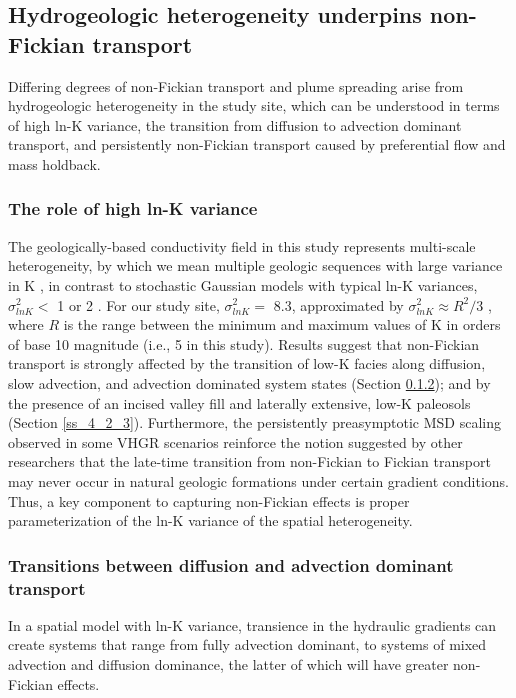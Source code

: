 %
%
\subsection{Hydrogeologic heterogeneity underpins non-Fickian transport}
\label{ss_4_2}

Differing degrees of non-Fickian transport and plume spreading arise from hydrogeologic heterogeneity in the study site, which can be understood in terms of high ln-K variance, the transition from diffusion to advection dominant transport, and persistently non-Fickian transport caused by preferential flow and mass holdback.

%
\subsubsection{The role of high ln-K variance}
\label{ss_4_2_1}

The geologically-based conductivity field in this study represents multi-scale heterogeneity, by which we mean multiple geologic sequences with large variance in K \citep{weissmann1999multi}, in contrast to stochastic Gaussian models with typical ln-K variances, $\sigma^2_{lnK} < $ 1 or 2 \citep{gelhar1993stochastic, rubin2003applied}. For our study site, $\sigma^2_{lnK} = $ 8.3, approximated by $\sigma^2_{lnK} \approx R^2/3$ \citep{fogg2016debates}, where $R$ is the range between the minimum and maximum values of K in orders of base 10 magnitude (i.e., 5 in this study).  Results suggest that non-Fickian transport is strongly affected by the transition of low-K facies along diffusion, slow advection, and advection dominated system states (Section \ref{ss_4_2_2}); and by the presence of an incised valley fill and laterally extensive, low-K paleosols (Section \ref{ss_4_2_3}). Furthermore, the persistently preasymptotic MSD scaling observed in some VHGR scenarios reinforce the notion suggested by other researchers \citep[e.g.][]{matheron1980transport, neuman1990universal, zhang2007persistence} that the late-time transition from non-Fickian to Fickian transport may never occur in natural geologic formations under certain gradient conditions. Thus, a key component to capturing non-Fickian effects is proper parameterization of the ln-K variance of the spatial heterogeneity.

%
\subsubsection{Transitions between diffusion and advection dominant transport}
\label{ss_4_2_2}
In a spatial model with ln-K variance, transience in the hydraulic gradients can create systems that range from fully advection dominant, to systems of mixed advection and diffusion dominance, the latter of which will have greater non-Fickian effects.

